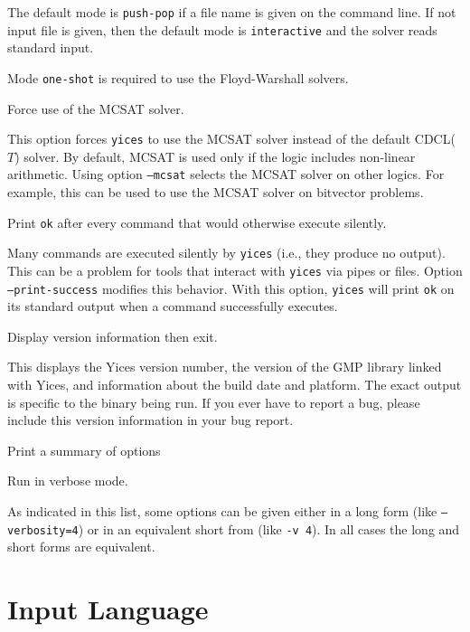 \documentclass[11pt,twoside,fleqn,openright,titlepage]{cslreport}
\newenvironment{options}{
\begin{list}{}{
\setlength{\labelsep}{1.8ex}
\setlength{\labelwidth}{0pt}
\setlength{\itemindent}{-0.5\leftmargin}
\settowidth{\leftmargin}{\texttt{--}}
\renewcommand{\makelabel}{\optionlabel}}}
{\end{list}}
\newcommand*\optionlabel[1]{\hspace\labelsep\texttt{#1}}
\begin{document}
\begin{options}
  The default mode is \texttt{push-pop} if a file name is given on the
  command line. If  not input file is given, then  the default mode is
  \texttt{interactive} and the solver reads standard input.

  Mode \texttt{one-shot} is required to use the Floyd-Warshall solvers.

\item[--mcsat] Force use of the MCSAT solver.

  This option forces \texttt{yices} to use the MCSAT solver instead of
  the default CDCL($T$) solver. By default, MCSAT is used only if the
  logic includes non-linear arithmetic. Using option \texttt{--mcsat}
  selects the MCSAT solver on other logics. For example, this can be
  used to use the MCSAT solver on bitvector problems.

\item[--print-success] Print \texttt{ok} after every command that would
  otherwise execute silently.

  Many commands are executed silently by \texttt{yices} (i.e., they
  produce no output). This can be a problem for tools that interact
  with \texttt{yices} via pipes or files. Option
  \texttt{--print-success} modifies this behavior. With this option,
  \texttt{yices} will print \texttt{ok} on its standard output when a
  command successfully executes.

\item[--version, -V] Display version information then exit.

  This displays the Yices version number, the version of the GMP library
  linked with Yices, and information about the build date and platform.
  The exact output is specific to the binary being run.
  If you ever have to report a bug, please include this version information
  in your bug report.

\item[--help, -h] Print a summary of options

\item[--verbosity=<level>, -v <level>] Run in verbose mode.
\end{options}
As indicated in this list, some options can be given either in a long
form (like \texttt{--verbosity=4}) or in an equivalent short from (like
\texttt{-v 4}). In all cases the long and short forms are equivalent.

\section{Input Language}
\end{document}
